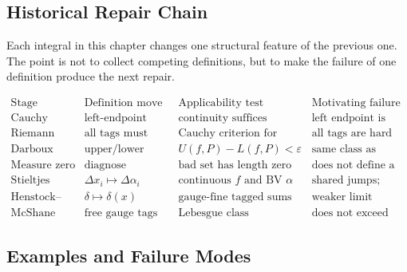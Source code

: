 \subsection*{Historical Repair Chain}

\begin{exposition}
Each integral in this chapter changes one structural feature of the previous
one. The point is not to collect competing definitions, but to make the
failure of one definition produce the next repair.

\[
\begin{array}{c|c|c|c}
\text{Stage} & \text{Definition move} & \text{Applicability test} &
\text{Motivating failure}\\
\hline
\text{Cauchy} &
\text{left-endpoint sums} &
\text{continuity suffices} &
\text{left endpoint is privileged}\\
\text{Riemann} &
\text{all tags must agree} &
\text{Cauchy criterion for sums} &
\text{all tags are hard to control}\\
\text{Darboux} &
\text{upper/lower sums} &
U(f,P)-L(f,P)<\varepsilon &
\text{same class as Riemann}\\
\text{Measure zero} &
\text{diagnose discontinuities} &
\text{bad set has length zero} &
\text{does not define a new integral here}\\
\text{Stieltjes} &
\Delta x_i\mapsto\Delta\alpha_i &
\text{continuous }f\text{ and BV }\alpha &
\text{shared jumps; rough rulers}\\
\text{Henstock--Kurzweil} &
\delta\mapsto\delta(x) &
\text{gauge-fine tagged sums} &
\text{weaker limit machinery}\\
\text{McShane} &
\text{free gauge tags} &
\text{Lebesgue class} &
\text{does not exceed HK}
\end{array}
\]
\end{exposition}

\subsection*{Examples and Failure Modes}

